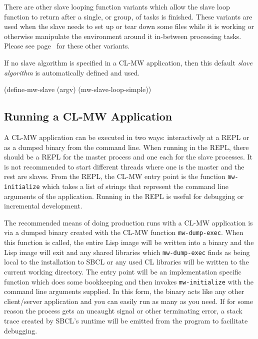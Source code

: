 \documentclass[titlepage,12pt]{book}
\newcommand{\xsmall}{\latexhtml{\small}{}}
\newcommand{\xnormalsize}{\latexhtml{\normalsize}{}}
\newcommand{\clmw}{\xsmall\textsc{CL-MW}\xnormalsize\xspace}
\newcommand{\sa}{\textit{slave algorithm}\xspace}
\newcommand{\func}[1]{\mbox{\texttt{#1}}\xspace}
\begin{document}
There are other slave looping function variants which allow the
slave loop function to return after a single, or group, of tasks
is finished.  These variants are used when the slave needs to set up
or tear down some files while it is working or otherwise manipulate
the environment around it in-between processing tasks. Please see
page~\pageref{slave-algorithm-api} for these other variants.

If no slave algorithm is specified in a \clmw application, then this
default \sa is automatically defined and used.

\begin{lisp}[caption=Default Slave Algorithm]
(define-mw-slave (argv)
  (mw-slave-loop-simple))
\end{lisp}

\subsection{Running a \clmw Application}

A \clmw application can be executed in two ways: interactively at a
REPL or as a dumped binary from the command line. When running in the
REPL, there should be a REPL for the master process and one each for
the slave processes. It is not recommended to start different threads
where one is the master and the rest are slaves.  From the REPL,
the \clmw entry point is the function \func{mw-initialize} which
takes a list of strings that represent the command line arguments
of the application. Running in the REPL is useful for debugging or
incremental development.

The recommended means of doing production runs with a \clmw
application is via a dumped binary created with the \clmw function
\func{mw-dump-exec}. When this function is called, the entire Lisp
image will be written into a binary and the Lisp image will exit
and any shared libraries which \func{mw-dump-exec} finds as being
local to the installation to SBCL or any used CL libraries will be
written to the current working directory. The entry point will be an
implementation specific function which does some bookkeeping and then
invokes \func{mw-initialize} with the command line arguments supplied.
In this form, the binary acts like any other client/server application
and you can easily run as many as you need.  If for some reason the
process gets an uncaught signal or other terminating error, a stack
trace created by SBCL's runtime will be emitted from the program to
facilitate debugging.
\end{document}
